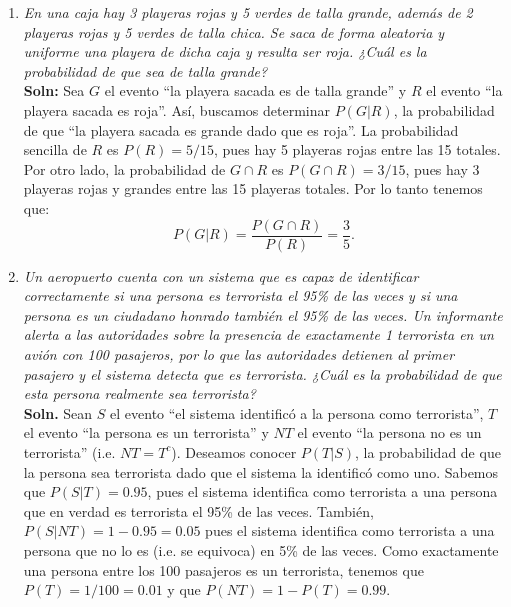 \documentclass[letterpaper,11pt]{article}
\begin{document}
\begin{enumerate}
\item \emph{En una caja hay 3 playeras rojas y 5 verdes de talla grande, además de 2 playeras rojas y
5 verdes de talla chica. Se saca de forma aleatoria y uniforme una playera de dicha caja y
resulta ser roja. ¿Cuál es la probabilidad de que sea de talla grande?}\\
{\noindent \bf Soln:} Sea $G$ el evento ``la playera sacada es de talla grande'' y $R$ el evento ``la playera
sacada es roja''. Así, buscamos determinar $P(G|R)$, la probabilidad de que  ``la playera sacada es
grande dado que es roja''. La
probabilidad sencilla de $R$ es $P(R)=5/15$, pues hay 5 playeras rojas entre las 15 totales. Por otro
lado, la probabilidad de $G\cap R$  es $P(G\cap R)=3/15$, pues hay 3 playeras rojas y grandes
entre las 15 playeras totales.
Por lo tanto tenemos que: 
\[P(G| R)=\frac{P(G\cap R)}{P(R)}=\frac{3}{5}.\]
\item \emph{Un aeropuerto cuenta con un sistema que es capaz de identificar correctamente si una persona
es terrorista el 95\% de las veces y si una persona es un ciudadano honrado también el 95\% de
las veces. Un informante alerta a las autoridades sobre la presencia de exactamente 1 terrorista
en un avión con 100 pasajeros, por lo que las autoridades detienen al primer pasajero y el
sistema detecta que es terrorista. ¿Cuál es la probabilidad de que esta persona realmente sea
terrorista?}\\
    {\bf Soln.} Sean $S$ el evento ``el sistema identificó a la persona como terrorista'', $T$ el  evento ``la
    persona es un terrorista'' y $NT$ el evento ``la persona no es un terrorista'' (i.e. $NT= T^c$). Deseamos 
    conocer $P(T|S)$, la probabilidad de que la persona sea terrorista dado que el sistema la identificó como
    uno. Sabemos
    que $P(S|T)=0.95$, pues el sistema identifica como terrorista a una persona que en verdad es terrorista el
    95\% de las veces. También, $P(S|NT)=1-0.95=0.05$ pues el sistema identifica como terrorista a una persona
    que no lo es (i.e. se equivoca) en  5\% de las veces. Como exactamente una persona entre los 100 pasajeros
    es un terrorista, tenemos que $P(T)=1/100=0.01$ y que $P(NT)=1-P(T)=0.99$. 


\end{enumerate}
\end{document}
